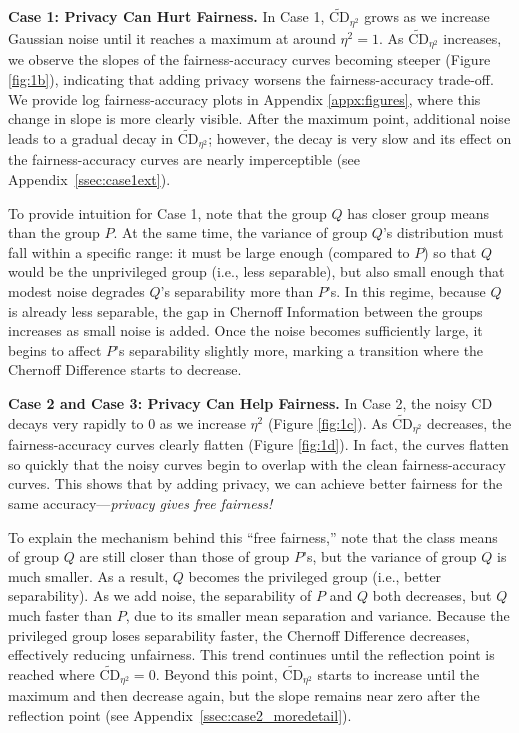 \documentclass[11pt,letterpaper]{article}
\begin{document}
\textbf{Case 1: Privacy Can Hurt Fairness.} In Case 1, $\widetilde{\text{CD}}_{\eta^2}$ grows as we increase Gaussian noise until it reaches a maximum at around $\eta^2 = 1$. As $\widetilde{\text{CD}}_{\eta^2}$ increases, we observe the slopes of the fairness-accuracy curves becoming steeper (Figure \ref{fig:1b}), indicating that adding privacy worsens the fairness-accuracy trade-off. We provide log fairness-accuracy plots in Appendix \ref{appx:figures}, where this change in slope is more clearly visible. 
After the maximum point, additional noise leads to a gradual decay in $\widetilde{\text{CD}}_{\eta^2}$; however, the decay is very slow and its effect on the fairness-accuracy curves are nearly imperceptible (see Appendix~\ref{ssec:case1ext}).  

To provide intuition for Case 1, note that the group $Q$ has closer group means than the group $P$. 
At the same time, the variance of group $Q$'s distribution must fall within a specific range: it must be large enough (compared to $P$) so that $Q$ would be the unprivileged group (i.e., less separable), 
but also small enough that modest noise degrades $Q$'s separability more than $P$'s. In this regime, because $Q$ is already less separable, the gap in Chernoff Information between the groups increases as small noise is added. Once the noise becomes sufficiently large, it begins to affect $P$'s separability slightly more, marking a transition where the Chernoff Difference starts to decrease. 


\textbf{Case 2 and Case 3: Privacy Can Help Fairness.} In Case 2, the noisy CD decays very rapidly to 0 as we increase $\eta^2$ (Figure \ref{fig:1c}). As $\widetilde{\text{CD}}_{\eta^2}$ decreases, the fairness-accuracy curves clearly flatten (Figure \ref{fig:1d}). In fact, the curves flatten so quickly that the noisy curves begin to overlap with the clean fairness-accuracy curves. This shows that by adding privacy, we can achieve better fairness for the same accuracy---\textit{privacy gives free fairness!} 

To explain the mechanism behind this ``free fairness,'' note that the class means of group $Q$ are still closer than those of group $P$'s, but the variance of group $Q$ is much smaller. As a result, $Q$  becomes the privileged group (i.e., better separability). As we add noise, the separability of $P$ and $Q$ both decreases, but $Q$ much faster than $P$, due to its smaller mean separation and variance. Because the privileged group loses separability faster, the Chernoff Difference decreases, effectively reducing unfairness.
This trend continues until the reflection point is reached where $\widetilde{\text{CD}}_{\eta^2} = 0$. Beyond this point, $\widetilde{\text{CD}}_{\eta^2}$ starts to increase until the maximum and then decrease again, but the slope remains near zero after the reflection point (see Appendix~\ref{ssec:case2_moredetail}).
\end{document}

